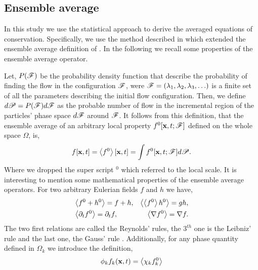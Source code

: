
\subsection{Ensemble average}
In this study we use the statistical approach to derive the averaged equations of conservation. 
Specifically, we use the method described in \citet{zhang2021ensemble} which extended the ensemble average definition of \citet{batchelor1972sedimentation}. 
In the following we recall some properties of the ensemble average operator. 

Let, $P(\mathscr{F})$ be the probability density function that describe the probability of finding the flow in the configuration $\mathscr{F}$, were $\mathscr{F} = (\lambda_1,\lambda_2,\lambda_3,\ldots)$ is a finite set of all the parameters describing the initial flow configuration.
Then, we define $d\mathscr{P} = P(\mathscr{F})d\mathscr{F}$ as the probable number of flow in the incremental region of the particles' phase space $d\mathscr{F}$ around $\mathscr{F}$. 
It follows from this definition, that the ensemble average of an arbitrary local property $f^0[\textbf{x},t;\mathscr{F}]$ defined on the whole space $\Omega$, is,
\begin{equation}
    f[\textbf{x},t]
    = \left<f^0\right>[\textbf{x},t]
    =\int f^0[\textbf{x},t;\mathscr{F}] d\mathscr{P}. 
    \label{eq:avg}
\end{equation}  
Where we dropped the super script $^0$ which referred to the local scale. 
It is interesting to mention some mathematical properties of the ensemble average operators. 
For two arbitrary Eulerian fields $f$ and $h$ we have,
\begin{align}
    &\left<f^0+h^0\right> = f+h, 
    &\left<\left<f^0\right>h^0\right> = gh, \nonumber \\
    &\left<\partial_t f^0\right> 
    = \partial_t f, 
    &\left<\mathbf{\nabla} f^0\right>
    = \mathbf{\nabla} f. 
    \label{eq:avg_properties}
\end{align}
The two first relations are called the Reynolds' rules, the $3^{th}$ one is the Leibniz' 
rule and the last one, the Gauss' rule \citep{drew1983mathematical}.
Additionally, for any phase quantity defined in $\Omega_k$ we introduce the definition, 
\begin{equation}
    \phi_k f_k (\textbf{x},t) = \left<\chi_k f_k^0\right>
    \label{eq:1_avg}
\end{equation}
